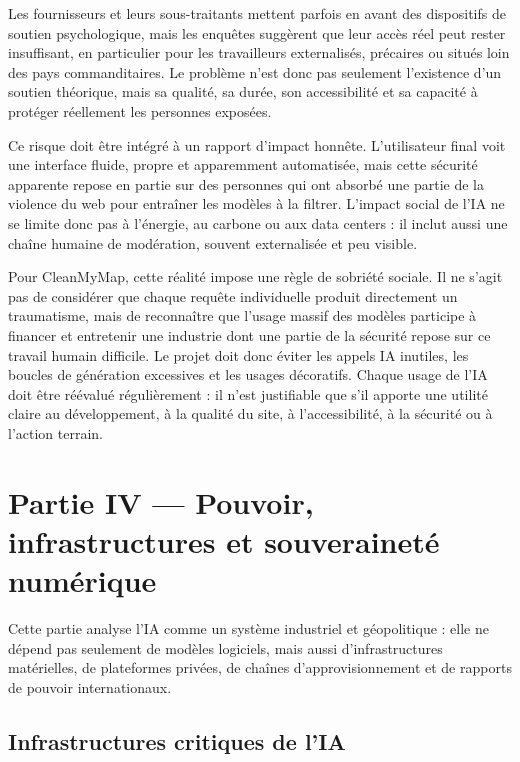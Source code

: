 \documentclass[
  10pt,
  a4paper,
  DIV=11,
  numbers=noendperiod,
  oneside]{scrreprt}
\begin{document}
Les fournisseurs et leurs sous-traitants mettent parfois en avant des
dispositifs de soutien psychologique, mais les enquêtes suggèrent que
leur accès réel peut rester insuffisant, en particulier pour les
travailleurs externalisés, précaires ou situés loin des pays
commanditaires. Le problème n'est donc pas seulement l'existence d'un
soutien théorique, mais sa qualité, sa durée, son accessibilité et sa
capacité à protéger réellement les personnes exposées.

Ce risque doit être intégré à un rapport d'impact honnête. L'utilisateur
final voit une interface fluide, propre et apparemment automatisée, mais
cette sécurité apparente repose en partie sur des personnes qui ont
absorbé une partie de la violence du web pour entraîner les modèles à la
filtrer. L'impact social de l'IA ne se limite donc pas à l'énergie, au
carbone ou aux data centers : il inclut aussi une chaîne humaine de
modération, souvent externalisée et peu visible.

Pour CleanMyMap, cette réalité impose une règle de sobriété sociale. Il
ne s'agit pas de considérer que chaque requête individuelle produit
directement un traumatisme, mais de reconnaître que l'usage massif des
modèles participe à financer et entretenir une industrie dont une partie
de la sécurité repose sur ce travail humain difficile. Le projet doit
donc éviter les appels IA inutiles, les boucles de génération excessives
et les usages décoratifs. Chaque usage de l'IA doit être réévalué
régulièrement : il n'est justifiable que s'il apporte une utilité claire
au développement, à la qualité du site, à l'accessibilité, à la sécurité
ou à l'action terrain.

\chapter{Partie IV --- Pouvoir, infrastructures et souveraineté
numérique}\label{partie-iv-pouvoir-infrastructures-et-souverainete-numerique}

Cette partie analyse l'IA comme un système industriel et géopolitique :
elle ne dépend pas seulement de modèles logiciels, mais aussi
d'infrastructures matérielles, de plateformes privées, de chaînes
d'approvisionnement et de rapports de pouvoir internationaux.

\section{Infrastructures critiques de
l'IA}\label{infrastructures-critiques-de-lia}
\end{document}
